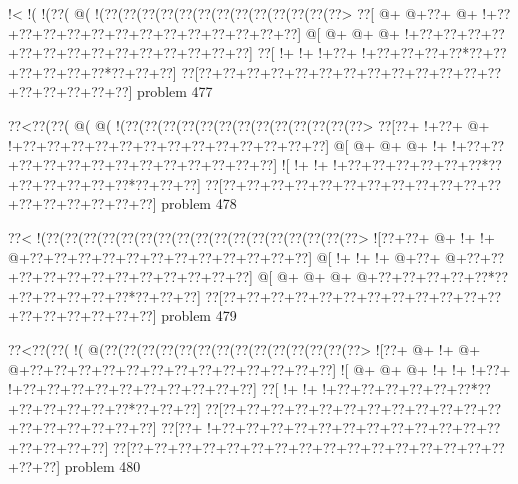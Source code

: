 \vbox{\vbox{\goo
\- !<\- !(\- !(\0??(\- @(\- !(\0??(\0??(\0??(\0??(\0??(\0??(\0??(\0??(\0??(\0??(\0??(\0??(\0??>
\0??[\- @+\- @+\0??+\- @+\- !+\0??+\0??+\0??+\0??+\0??+\0??+\0??+\0??+\0??+\0??+\0??+\0??+\0??]
\- @[\- @+\- @+\- @+\- !+\0??+\0??+\0??+\0??+\0??+\0??+\0??+\0??+\0??+\0??+\0??+\0??+\0??+\0??]
\0??[\- !+\- !+\- !+\0??+\- !+\0??+\0??+\0??+\0??*\0??+\0??+\0??+\0??+\0??+\0??*\0??+\0??+\0??]
\0??[\0??+\0??+\0??+\0??+\0??+\0??+\0??+\0??+\0??+\0??+\0??+\0??+\0??+\0??+\0??+\0??+\0??+\0??]
}
\hfil problem 477\hfil\break
}



\vbox{\vbox{\goo
\0??<\0??(\0??(\- @(\- @(\- !(\0??(\0??(\0??(\0??(\0??(\0??(\0??(\0??(\0??(\0??(\0??(\0??(\0??>
\0??[\0??+\- !+\0??+\- @+\- !+\0??+\0??+\0??+\0??+\0??+\0??+\0??+\0??+\0??+\0??+\0??+\0??+\0??]
\- @[\- @+\- @+\- @+\- !+\- !+\0??+\0??+\0??+\0??+\0??+\0??+\0??+\0??+\0??+\0??+\0??+\0??+\0??]
\- ![\- !+\- !+\- !+\0??+\0??+\0??+\0??+\0??+\0??*\0??+\0??+\0??+\0??+\0??+\0??*\0??+\0??+\0??]
\0??[\0??+\0??+\0??+\0??+\0??+\0??+\0??+\0??+\0??+\0??+\0??+\0??+\0??+\0??+\0??+\0??+\0??+\0??]
}
\hfil problem 478\hfil\break
}



\vbox{\vbox{\goo
\0??<\- !(\0??(\0??(\0??(\0??(\0??(\0??(\0??(\0??(\0??(\0??(\0??(\0??(\0??(\0??(\0??(\0??(\0??>
\- ![\0??+\0??+\- @+\- !+\- !+\- @+\0??+\0??+\0??+\0??+\0??+\0??+\0??+\0??+\0??+\0??+\0??+\0??]
\- @[\- !+\- !+\- !+\- @+\0??+\- @+\0??+\0??+\0??+\0??+\0??+\0??+\0??+\0??+\0??+\0??+\0??+\0??]
\- @[\- @+\- @+\- @+\- @+\0??+\0??+\0??+\0??+\0??*\0??+\0??+\0??+\0??+\0??+\0??*\0??+\0??+\0??]
\0??[\0??+\0??+\0??+\0??+\0??+\0??+\0??+\0??+\0??+\0??+\0??+\0??+\0??+\0??+\0??+\0??+\0??+\0??]
}
\hfil problem 479\hfil\break
}



\vbox{\vbox{\goo
\0??<\0??(\0??(\- !(\- @(\0??(\0??(\0??(\0??(\0??(\0??(\0??(\0??(\0??(\0??(\0??(\0??(\0??(\0??>
\- ![\0??+\- @+\- !+\- @+\- @+\0??+\0??+\0??+\0??+\0??+\0??+\0??+\0??+\0??+\0??+\0??+\0??+\0??]
\- ![\- @+\- @+\- @+\- !+\- !+\- !+\0??+\- !+\0??+\0??+\0??+\0??+\0??+\0??+\0??+\0??+\0??+\0??]
\0??[\- !+\- !+\- !+\0??+\0??+\0??+\0??+\0??+\0??*\0??+\0??+\0??+\0??+\0??+\0??*\0??+\0??+\0??]
\0??[\0??+\0??+\0??+\0??+\0??+\0??+\0??+\0??+\0??+\0??+\0??+\0??+\0??+\0??+\0??+\0??+\0??+\0??]
\0??[\0??+\- !+\0??+\0??+\0??+\0??+\0??+\0??+\0??+\0??+\0??+\0??+\0??+\0??+\0??+\0??+\0??+\0??]
\0??[\0??+\0??+\0??+\0??+\0??+\0??+\0??+\0??+\0??+\0??+\0??+\0??+\0??+\0??+\0??+\0??+\0??+\0??]
}
\hfil problem 480\hfil\break
}



